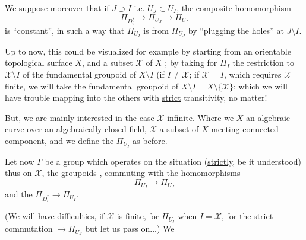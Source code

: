 We suppose moreover that if $J\supset I$ i.e. $U_J\subset U_I$,  the composite homomorphism
\[
\Pi_{D_i^*}\longrightarrow\Pi_{U_J}\longrightarrow\Pi_{U_I}
\]
is ``constant'', in such a way that $\Pi_{U_I}$ is  from $\Pi_{U_J}$ by ``plugging the holes'' at $J\setminus I$.

Up to now,  this could be visualized for example by starting from an orientable topological surface  $X$, and a subset  $\mathcal{X}$ of $X$  ; by taking for $\Pi_I$ the restriction to $\mathcal{X}\setminus I$ of the fundamental groupoid of $X\setminus I$ (if $I\ne\mathcal{X}$; if $\mathcal{X}=I$, which requires $\mathcal{X}$ finite, we will take the fundamental groupoid of $X\setminus I=X\setminus\{\mathcal{X}\}$; which we will have trouble mapping into the others with \uline{strict} transitivity, no matter!

But, we are mainly interested in the case $\mathcal{X}$ infinite. Where we  $X$ an algebraic curve over
an algebraically closed field, $\mathcal{X}$ a subset of $X$ meeting  connected component, and we define the $\Pi_{U_I}$ as before.

Let now $\Gamma$ be a group which operates on the situation (\uline{strictly}, be it understood) thus on  $\mathcal{X}$,  the groupoids ,  commuting with the homomorphisms 
\[
\Pi_{U_I}\longrightarrow\Pi_{U_J}
\]
and the $\Pi_{D_i^*}\longrightarrow\Pi_{U_I}$.

(We will have difficulties, if $\mathcal{X}$ is finite, for $\Pi_{U_I}$ when $I=\mathcal{X}$, for the \uline{strict} commutation  $\longrightarrow\Pi_{U_J}$  but let us pass on...)
We    

